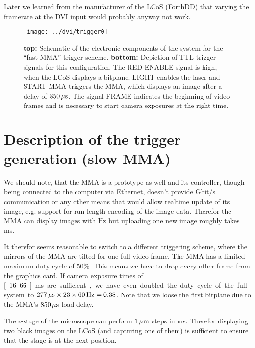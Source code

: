Later we learned from the manufacturer of the LCoS (ForthDD) that
varying the framerate at the DVI input would probably anyway not work.

\begin{figure}[!hbt]
  \centering
  \texttt{[image: ../dvi/trigger0]}
  \caption{{\bf top:} Schematic of the electronic components of the
    system for the ``fast MMA'' trigger scheme. {\bf bottom:}
    Depiction of TTL trigger signals for this configuration. The
    \textsf{RED-ENABLE} signal is high, when the LCoS displays a
    bitplane. \textsf{LIGHT} enables the laser and \textsf{START-MMA}
    triggers the MMA, which displays an image after a delay of
    $\unit[850]{\mu s}$. The signal \textsf{FRAME} indicates the
    beginning of video frames and is necessary to start camera
    exposures at the right time.}
  \label{fig:trigger0}
\end{figure}


\section{Description of the trigger generation (slow MMA)}
\label{sec:dvi_slow}
We should note, that the MMA is a prototype as well and its
controller, though being connected to the computer via Ethernet,
doesn't provide \unit[1]{Gbit/s} communication or any other means that
would allow realtime update of its image, e.g. support for run-length
encoding of the image data. Therefor the MMA can display images with
\unit[660]{Hz} but uploading one new image roughly takes
\unit[80]{ms}.

It therefor seems reasonable to switch to a different triggering
scheme, where the mirrors of the MMA are tilted for one full video
frame. The MMA has a limited maximum duty cycle of 50\%. This means we
have to drop every other frame from the graphics card. If camera
exposure times of \unit[16.66]{ms} are sufficient, we have even
doubled the duty cycle of the full system to $\unit[277]{\mu
  s}\times23\times\unit[60]{Hz}=0.38$. Note that we loose the first
bitplane due to the MMA's $\unit[850]{\mu s}$ load delay.

The z-stage of the microscope can perform $\unit[1]{\mu m}$ steps in
\unit[20]{ms}. Therefor displaying two black images on the LCoS (and
capturing one of them) is sufficient to ensure that the stage is at
the next position.

